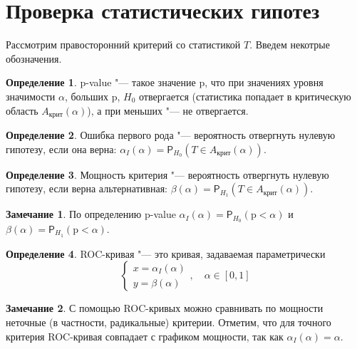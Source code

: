\documentclass[specialist,
substylefile = spbu_report.rtx,
subf,href,colorlinks=true, 12pt]{disser}
\theoremstyle{definition}
\newtheorem{definition}{Определение}
\newtheorem{remark}{Замечание}
\begin{document}
\section{Проверка статистических гипотез}
Рассмотрим правосторонний критерий со статистикой $T$. Введем некотрые обозначения.
\begin{definition}
	p-value "--- такое значение $\mathrm p$, что при значениях уровня значимости $\alpha$, больших $\mathrm p$, $H_0$ отвергается (статистика попадает в критическую область $A_\text{крит}(\alpha)$), а при меньших "--- не отвергается.
\end{definition}
\begin{definition}
	Ошибка первого рода "--- вероятность отвергнуть нулевую гипотезу, если она верна: $\alpha_I(\alpha)=\mathsf P_{H_0}(T\in A_\text{крит}(\alpha))$.
\end{definition}
\begin{definition}
	Мощность критерия "--- вероятность отвергнуть нулевую гипотезу, если верна альтернативная: $\beta(\alpha)=\mathsf P_{H_1}(T\in A_\text{крит}(\alpha))$.
\end{definition}
\begin{remark}
	По определению p-value $\alpha_I(\alpha)=\mathsf P_{H_0}(\mathrm p < \alpha)$ и $\beta(\alpha)=\mathsf P_{H_1}(\mathrm p < \alpha)$.
\end{remark}
\begin{definition}
	ROC-кривая "--- это кривая, задаваемая параметрически
	\[
		\begin{cases}
			x=\alpha_I(\alpha) \\
			y=\beta(\alpha)
		\end{cases},\quad \alpha\in[0,1]
	\]
\end{definition}
\begin{remark}
	С помощью ROC-кривых можно сравнивать по мощности неточные (в частности, радикальные) критерии. Отметим, что для точного критерия ROC-кривая совпадает с графиком мощности, так как $\alpha_I(\alpha)=\alpha$.
\end{remark}
\end{document}
